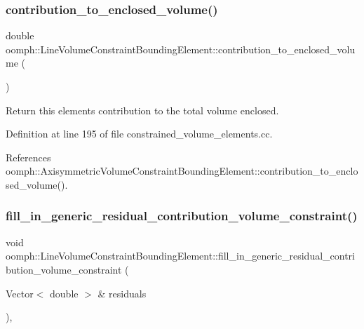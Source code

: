 \subsubsection{\texorpdfstring{contribution\+\_\+to\+\_\+enclosed\+\_\+volume()}{contribution\_to\_enclosed\_volume()}}
{\footnotesize\ttfamily double oomph\+::\+Line\+Volume\+Constraint\+Bounding\+Element\+::contribution\+\_\+to\+\_\+enclosed\+\_\+volume (\begin{DoxyParamCaption}{ }\end{DoxyParamCaption})}



Return this element\textquotesingle{}s contribution to the total volume enclosed. 



Definition at line 195 of file constrained\+\_\+volume\+\_\+elements.\+cc.



References oomph\+::\+Axisymmetric\+Volume\+Constraint\+Bounding\+Element\+::contribution\+\_\+to\+\_\+enclosed\+\_\+volume().

\mbox{\label{classoomph_1_1LineVolumeConstraintBoundingElement_a03145a064e559d786f730c85000f9fb4}} 
\subsubsection{\texorpdfstring{fill\+\_\+in\+\_\+generic\+\_\+residual\+\_\+contribution\+\_\+volume\+\_\+constraint()}{fill\_in\_generic\_residual\_contribution\_volume\_constraint()}}
{\footnotesize\ttfamily void oomph\+::\+Line\+Volume\+Constraint\+Bounding\+Element\+::fill\+\_\+in\+\_\+generic\+\_\+residual\+\_\+contribution\+\_\+volume\+\_\+constraint (\begin{DoxyParamCaption}\item[{Vector$<$ double $>$ \&}]{residuals }\end{DoxyParamCaption})\hspace{0.3cm}{\ttfamily [protected]}, {\ttfamily [virtual]}}




